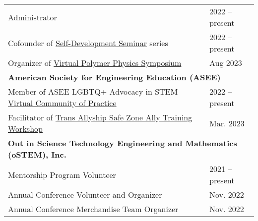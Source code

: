 \documentclass[letterpaper,11pt]{article}
\begin{document}
\begin{tabular}{@{}p{}l@{}}
  \hspace{3mm} Administrator                                                                                                                 & 2022 -- present \\
  \hspace{3mm} Cofounder of \href{https://sites.google.com/view/polymerphysics/self-dev-seminars}{Self-Development Seminar} series                                                                                  & 2022 -- present \\
  \hspace{3mm} Organizer of \href{https://sites.google.com/view/polymerphysics/vpps-2023-schedule}{Virtual Polymer Physics Symposium}                                                                                & Aug 2023 \\[4pt]
  \multicolumn{2}{l}{\hspace{-3mm} \bf{American Society for Engineering Education (ASEE)}} \\
  \hspace{3mm} Member of ASEE LGBTQ+ Advocacy in STEM \href{https://lgbtq.asee.org/our-community/}{Virtual Community of Practice}                                                          & 2022 -- present \\
  \hspace{3mm} Facilitator of \href{https://lgbtq.asee.org/ally-training/online-workshops/#:~:text=Safe\%20Zone\%20Ally\%20Training\%3A\%20Tans\%20Allyship}{Trans Allyship Safe Zone Ally Training Workshop}                                                                & Mar. 2023 \\[4pt]
  \multicolumn{2}{l}{\hspace{-3mm} \bf{Out in Science Technology Engineering and Mathematics (oSTEM), Inc.}} \\
  \hspace{3mm} Mentorship Program Volunteer                                                                                                  & 2021 -- present \\
  \hspace{3mm} Annual Conference Volunteer and Organizer                                                                                     & Nov. 2022 \\
  \hspace{3mm} Annual Conference Merchandise Team Organizer                                                                                  & Nov. 2022 \\

\end{tabular}
\end{document}
